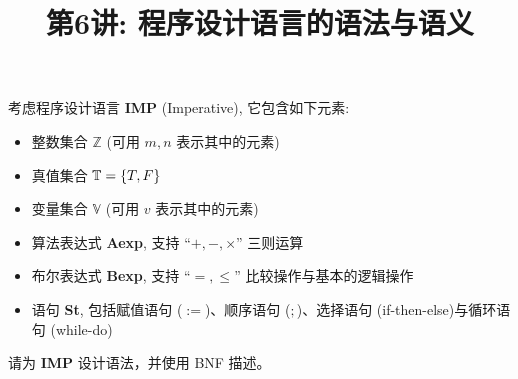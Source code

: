 \documentclass[a4paper, justified]{tufte-handout}
\title{第6讲: 程序设计语言的语法与语义}
\date{\zhtoday} %
\begin{document}
\maketitle
\noplagiarism %
\begin{abstract}
  \begin{center}{}
  \end{center}
\end{abstract}
\beginrequired

\begin{problem}[IMP]
  考虑程序设计语言 {\bf IMP} (Imperative), 它包含如下元素:
  \begin{itemize}
    \item 整数集合 $\mathbb{Z}$ (可用 $m,n$ 表示其中的元素)
    \item 真值集合 $\mathbb{T} = \{T, F\}$
    \item 变量集合 $\mathbb{V}$ (可用 $v$ 表示其中的元素)
    \item 算法表达式 {\bf Aexp}, 支持 ``$+, -, \times$'' 三则运算
    \item 布尔表达式 {\bf Bexp}, 支持 ``$=, \le$'' 比较操作与基本的逻辑操作
    \item 语句 {\bf St}, 包括赋值语句 ($:=$)、顺序语句 ($;$)、选择语句 (if-then-else)与循环语句 (while-do)
  \end{itemize}

  \noindent 请为 {\bf IMP} 设计语法，并使用 BNF 描述。
\end{problem}

\begin{solution}
\end{solution}

\beginoptional
\end{document}
